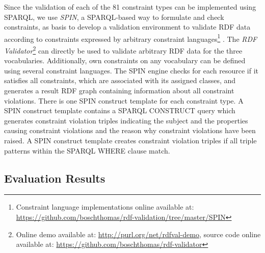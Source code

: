 \documentclass{llncs}
\begin{document}
Since the validation of each of the 81 constraint types can be implemented using SPARQL, we use \emph{SPIN}, a SPARQL-based way to formulate and check constraints, as basis to develop a
validation environment to validate RDF data according to constraints expressed by arbitrary constraint languages\footnote{Constraint language implementations online available at: \url{https://github.com/boschthomas/rdf-validation/tree/master/SPIN}} \cite{BoschEckert2014-2}.
The \emph{RDF Validator}\footnote{Online demo available at: \url{http://purl.org/net/rdfval-demo}, source code online available at: \url{https://github.com/boschthomas/rdf-validator}} can directly be used to validate arbitrary RDF data for the three vocabularies. Additionally, own constraints on any vocabulary can be defined using several constraint languages.
The SPIN engine checks for each resource if it satisfies all constraints, which are associated with its assigned classes, and generates a result RDF graph containing information about all constraint violations.
There is one SPIN construct template for each constraint type.
A SPIN construct template contains a SPARQL CONSTRUCT query which generates constraint violation triples indicating the subject and the properties causing constraint violations and the reason why constraint violations have been raised.
A SPIN construct template creates constraint violation triples if all triple patterns within the SPARQL WHERE clause match.

\subsection{Evaluation Results}

\end{document}
